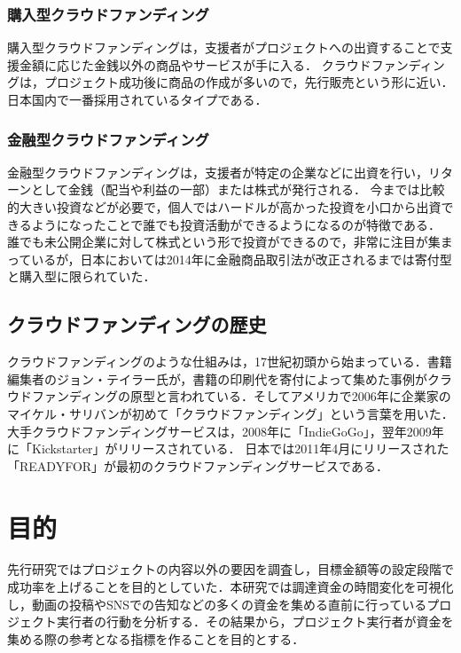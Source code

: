 \subsection{購入型クラウドファンディング}
購入型クラウドファンディングは，支援者がプロジェクトへの出資することで支援金額に応じた金銭以外の商品やサービスが手に入る．
クラウドファンディングは，プロジェクト成功後に商品の作成が多いので，先行販売という形に近い．
日本国内で一番採用されているタイプである．

\subsection{金融型クラウドファンディング}
金融型クラウドファンディングは，支援者が特定の企業などに出資を行い，リターンとして金銭（配当や利益の一部）または株式が発行される．
今までは比較的大きい投資などが必要で，個人ではハードルが高かった投資を小口から出資できるようになったことで誰でも投資活動ができるようになるのが特徴である．
誰でも未公開企業に対して株式という形で投資ができるので，非常に注目が集まっているが，日本においては2014年に金融商品取引法が改正されるまでは寄付型と購入型に限られていた．


\section{クラウドファンディングの歴史}
クラウドファンディングのような仕組みは，17世紀初頭から始まっている．書籍編集者のジョン・テイラー氏が，書籍の印刷代を寄付によって集めた事例がクラウドファンディングの原型と言われている\cite{rekishi}．そしてアメリカで2006年に企業家のマイケル・サリバンが初めて「クラウドファンディング」という言葉を用いた．大手クラウドファンディングサービスは，2008年に「IndieGoGo」，翌年2009年に「Kickstarter」がリリースされている．
日本では2011年4月にリリースされた「READYFOR」が最初のクラウドファンディングサービスである．




\chapter{目的}
先行研究\cite{miura}ではプロジェクトの内容以外の要因を調査し，目標金額等の設定段階で成功率を上げることを目的としていた．本研究では調達資金の時間変化を可視化し，動画の投稿やSNSでの告知などの多くの資金を集める直前に行っているプロジェクト実行者の行動を分析する．その結果から，プロジェクト実行者が資金を集める際の参考となる指標を作ることを目的とする．




